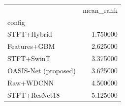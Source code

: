 \begin{tabular}{lr}
\toprule
 & mean\_rank \\
config &  \\
\midrule
STFT+Hybrid & 1.750000 \\
Features+GBM & 2.625000 \\
STFT+SwinT & 3.375000 \\
OASIS-Net (proposed) & 3.625000 \\
Raw+WDCNN & 4.500000 \\
STFT+ResNet18 & 5.125000 \\
\bottomrule
\end{tabular}
